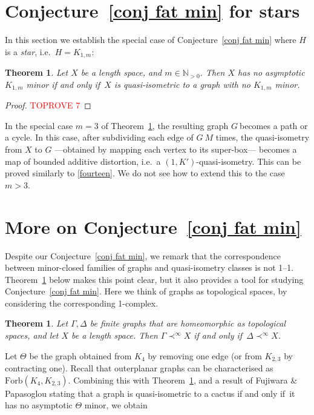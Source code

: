 \documentclass[a4paper]{article}
\newcommand{\defi}[1]{{\color{darkgray}\emph{#1}}}
\newtheorem{theorem}[proposition]{Theorem}
\newcommand{\N}{\ensuremath{\mathbb N}}
\newcommand{\g}{\ensuremath{G\ }}
\newcommand{\Tr}[1]{Theorem~\ref{#1}}
\newcommand{\Cnr}[1]{Con\-jecture~\ref{#1}}
\renewcommand{\iff}{if and only if}
\newcommand{\asm}[2]{\ensuremath{#1 \prec^\infty #2}}
\begin{document}
\section{\Cnr{conj fat min} for stars} \label{sec stars}

In this section we establish the special case of \Cnr{conj fat min} where $H$ is a \defi{star}, i.e.\ $H=K_{1,m}$:

\begin{theorem} \label{thm star}
Let $X$ be a length space, and $m\in \N_{>0}$. Then $X$ has no asymptotic $K_{1,m}$ minor \iff\ $X$ is quasi-isometric to a graph with no $K_{1,m}$ minor.
\end{theorem}
\begin{proof}\textcolor{red}{TOPROVE 7}\end{proof}

 In the special case $m=3$ of \Tr{thm star}, the resulting graph \g becomes a path or a cycle. In this case, after subdividing each edge of \g $M$ times, the quasi-isometry from $X$ to $G$ ---obtained by mapping each vertex to its super-box--- becomes a map of bounded additive distortion, i.e.\ a $(1,K')$-quasi-isometry. This can be proved similarly to \eqref{fourteen}. We do not see how to extend this to the case $m>3$.

\section{More on \Cnr{conj fat min}} \label{sec homeo}

Despite our \Cnr{conj fat min}, we remark that the correspondence between minor-closed families of graphs and quasi-isometry classes is not 1--1. \Tr{thm subdiv} below makes this point clear, but it also provides a tool for studying \Cnr{conj fat min}. Here we think of graphs as topological spaces, by considering the corresponding  1-complex.

\begin{theorem} \label{thm subdiv}
Let $\Gamma,\Delta$ be finite graphs that are homeomorphic as topological spaces, and let $X$ be a length space. Then  \asm{\Gamma}{X} \iff\ \asm{\Delta}{X}. 
\end{theorem}

 
Let  $\Theta$ be the graph obtained from $K_4$ by removing one edge (or from $K_{2,3}$ by contracting one). Recall that outerplanar graphs can be characterised as $\mathrm{Forb}(K_4, K_{2,3})$. Combining this with  \Tr{thm subdiv}, and a result of Fujiwara \& Papasoglou \cite{FujPapCoa} stating that a graph is quasi-isometric to a cactus \iff\ it has no asymptotic $\Theta$ minor, we obtain
\end{document}
